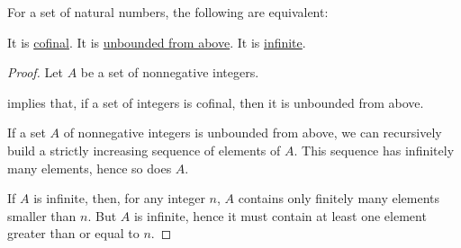 \begin{proposition}\label{thm:natural_numbers_confinal_equivalence}
  For a set of natural numbers, the following are equivalent:
  \begin{thmenum}
     It is \hyperref[def:cofinal_set]{cofinal}.
     It is \hyperref[def:extremal_points/bounds]{unbounded from above}.
     It is \hyperref[def:set_finiteness]{infinite}.
  \end{thmenum}
\end{proposition}
\begin{proof}
  Let \( A \) be a set of nonnegative integers.

    implies that, if a set of integers is cofinal, then it is unbounded from above.

   If a set \( A \) of nonnegative integers is unbounded from above, we can recursively build a strictly increasing sequence of elements of \( A \). This sequence has infinitely many elements, hence so does \( A \).

   If \( A \) is infinite, then, for any integer \( n \), \( A \) contains only finitely many elements smaller than \( n \). But \( A \) is infinite, hence it must contain at least one element greater than or equal to \( n \).
\end{proof}

